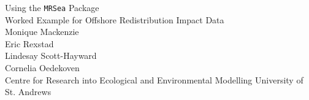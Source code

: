 
\begin{titlepage}

\begin{center}
\vspace* {0.70 in}
\huge{Using the {\tt MRSea} Package}\\[0.5 cm]
\Large{Worked Example for Offshore Redistribution Impact Data}\\

\vspace{1 in}
\Large{Monique Mackenzie}\\
\Large{Eric Rexstad}\\
\Large{Lindesay Scott-Hayward}\\
\Large{Cornelia Oedekoven}\\[0.5 cm]

\vspace{0.7 in}
\Large{Centre for Research into Ecological and Environmental Modelling}
\Large{University of St. Andrews}

\thispagestyle{empty}

\end{center}

\end{titlepage}
